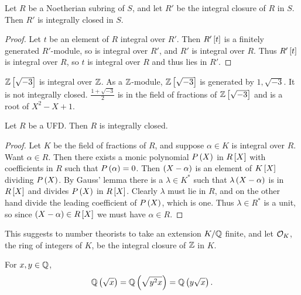 \begin{lemma}
Let $ R $ be a Noetherian subring of $ S $, and let $ R' $ be the integral closure of $ R $ in $ S $. Then $ R' $ is integrally closed in $ S $.
\end{lemma}

\begin{proof}
Let $ t $ be an element of $ R $ integral over $ R' $. Then $ R'\sb{t} $ is a finitely generated $ R' $-module, so is integral over $ R' $, and $ R' $ is integral over $ R $. Thus $ R'\sb{t} $ is integral over $ R $, so $ t $ is integral over $ R $ and thus lies in $ R' $.
\end{proof}

\begin{example*}
$ \Z\sb{\sqrt{-3}} $ is integral over $ \Z $. As a $ \Z $-module, $ \Z\sb{\sqrt{-3}} $ is generated by $ 1, \sqrt{-3} $. It is not integrally closed. $ \tfrac{1 + \sqrt{-3}}{2} $ is in the field of fractions of $ \Z\sb{\sqrt{-3}} $ and is a root of $ X^2 - X + 1 $.
\end{example*}

\begin{theorem}
Let $ R $ be a UFD. Then $ R $ is integrally closed.
\end{theorem}

\begin{proof}
Let $ K $ be the field of fractions of $ R $, and suppose $ \alpha \in K $ is integral over $ R $. Want $ \alpha \in R $. Then there exists a monic polynomial $ P\rb{X} $ in $ R\sb{X} $ with coefficients in $ R $ such that $ P\rb{\alpha} = 0 $. Then $ \rb{X - \alpha} $ is an element of $ K\sb{X} $ dividing $ P\rb{X} $. By Gauss' lemma there is a $ \lambda \in K^* $ such that $ \lambda\rb{X - \alpha} $ is in $ R\sb{X} $ and divides $ P\rb{X} $ in $ R\sb{X} $. Clearly $ \lambda $ must lie in $ R $, and on the other hand divide the leading coefficient of $ P\rb{X} $, which is one. Thus $ \lambda \in R^* $ is a unit, so since $ \rb{X - \alpha} \in R\sb{X} $ we must have $ \alpha \in R $.
\end{proof}

This suggests to number theorists to take an extension $ K / \Q $ finite, and let $ \OO_K $, the ring of integers of $ K $, be the integral closure of $ \Z $ in $ K $.

\begin{note*}
For $ x, y \in \Q $,
$$ \Q\rb{\sqrt{x}} = \Q\rb{\sqrt{y^2x}} = \Q\rb{y\sqrt{x}}. $$
\end{note*}

